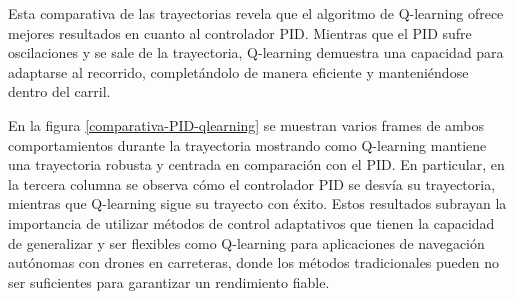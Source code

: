 Esta comparativa de las trayectorias revela que el algoritmo de Q-learning ofrece mejores resultados en cuanto al controlador PID. Mientras que el PID sufre oscilaciones y se sale de la trayectoria,
Q-learning demuestra una capacidad para adaptarse al recorrido, completándolo de manera eficiente y manteniéndose dentro del carril.



En la figura \ref{comparativa-PID-qlearning} se muestran varios frames de ambos comportamientos durante la trayectoria mostrando como Q-learning mantiene una trayectoria robusta y centrada 
en comparación con el PID. En particular, en la tercera columna se observa cómo el controlador PID se desvía su trayectoria, mientras que Q-learning sigue su trayecto con éxito. 
Estos resultados subrayan la importancia de utilizar métodos de control adaptativos que tienen la capacidad de generalizar y ser flexibles
como Q-learning para aplicaciones de navegación autónomas con drones en carreteras, donde los métodos 
tradicionales pueden no ser suficientes para garantizar un rendimiento fiable. 

